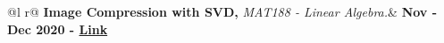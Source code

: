 \begin{tabularx}{\linewidth}{ @{}l r@{} }
\textbf{Image Compression with SVD,} \textit{MAT188 - Linear Algebra.}& \hfill \textbf{Nov - Dec 2020 - \href{https://www.github.com/destefy/portfolio}{Link}} \\[3.75pt]
 \\
\end{tabularx}
\\[8pt]